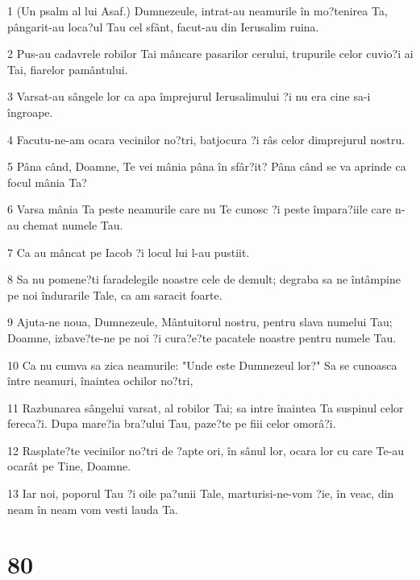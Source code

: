 \par 1 (Un psalm al lui Asaf.) Dumnezeule, intrat-au neamurile în mo?tenirea Ta, pângarit-au loca?ul Tau cel sfânt, facut-au din Ierusalim ruina.
\par 2 Pus-au cadavrele robilor Tai mâncare pasarilor cerului, trupurile celor cuvio?i ai Tai, fiarelor pamântului.
\par 3 Varsat-au sângele lor ca apa împrejurul Ierusalimului ?i nu era cine sa-i îngroape.
\par 4 Facutu-ne-am ocara vecinilor no?tri, batjocura ?i râs celor dimprejurul nostru.
\par 5 Pâna când, Doamne, Te vei mânia pâna în sfâr?it? Pâna când se va aprinde ca focul mânia Ta?
\par 6 Varsa mânia Ta peste neamurile care nu Te cunosc ?i peste împara?iile care n-au chemat numele Tau.
\par 7 Ca au mâncat pe Iacob ?i locul lui l-au pustiit.
\par 8 Sa nu pomene?ti faradelegile noastre cele de demult; degraba sa ne întâmpine pe noi îndurarile Tale, ca am saracit foarte.
\par 9 Ajuta-ne noua, Dumnezeule, Mântuitorul nostru, pentru slava numelui Tau; Doamne, izbave?te-ne pe noi ?i cura?e?te pacatele noastre pentru numele Tau.
\par 10 Ca nu cumva sa zica neamurile: "Unde este Dumnezeul lor?" Sa se cunoasca între neamuri, înaintea ochilor no?tri,
\par 11 Razbunarea sângelui varsat, al robilor Tai; sa intre înaintea Ta suspinul celor fereca?i. Dupa mare?ia bra?ului Tau, paze?te pe fiii celor omorâ?i.
\par 12 Rasplate?te vecinilor no?tri de ?apte ori, în sânul lor, ocara lor cu care Te-au ocarât pe Tine, Doamne.
\par 13 Iar noi, poporul Tau ?i oile pa?unii Tale, marturisi-ne-vom ?ie, în veac, din neam în neam vom vesti lauda Ta.

\chapter{80}

